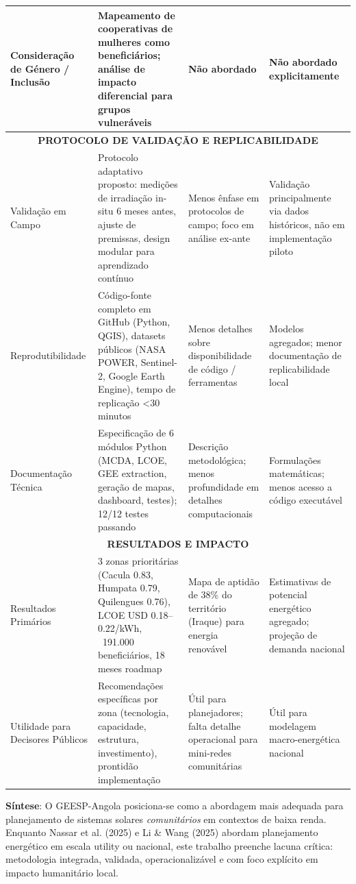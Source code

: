 \documentclass[12pt, a4paper]{article}
\begin{document}
\begin{table}[H]
\begin{tabular}{|p{3cm}|p{3cm}|p{3cm}|p{3cm}|}
\hline
Consideração de Género / Inclusão & Mapeamento de cooperativas de mulheres como beneficiários; análise de impacto diferencial para grupos vulneráveis & Não abordado & Não abordado explicitamente \\
\hline
\multicolumn{4}{|c|}{\textbf{PROTOCOLO DE VALIDAÇÃO E REPLICABILIDADE}} \\
\hline
Validação em Campo & Protocolo adaptativo proposto: medições de irradiação in-situ 6 meses antes, ajuste de premissas, design modular para aprendizado contínuo & Menos ênfase em protocolos de campo; foco em análise ex-ante & Validação principalmente via dados históricos, não em implementação piloto \\
\hline
Reprodutibilidade & Código-fonte completo em GitHub (Python, QGIS), datasets públicos (NASA POWER, Sentinel-2, Google Earth Engine), tempo de replicação <30 minutos & Menos detalhes sobre disponibilidade de código / ferramentas & Modelos agregados; menor documentação de replicabilidade local \\
\hline
Documentação Técnica & Especificação de 6 módulos Python (MCDA, LCOE, GEE extraction, geração de mapas, dashboard, testes); 12/12 testes passando & Descrição metodológica; menos profundidade em detalhes computacionais & Formulações matemáticas; menos acesso a código executável \\
\hline
\multicolumn{4}{|c|}{\textbf{RESULTADOS E IMPACTO}} \\
\hline
Resultados Primários & 3 zonas prioritárias (Cacula 0.83, Humpata 0.79, Quilengues 0.76), LCOE USD 0.18–0.22/kWh, ~191.000 beneficiários, 18 meses roadmap & Mapa de aptidão de 38\% do território (Iraque) para energia renovável & Estimativas de potencial energético agregado; projeção de demanda nacional \\
\hline
Utilidade para Decisores Públicos & Recomendações específicas por zona (tecnologia, capacidade, estrutura, investimento), prontidão implementação & Útil para planejadores; falta detalhe operacional para mini-redes comunitárias & Útil para modelagem macro-energética nacional \\
\hline
\end{tabular}
\end{table}

\textbf{Síntese}: O GEESP-Angola posiciona-se como a abordagem mais adequada para planejamento de sistemas solares \textit{comunitários} em contextos de baixa renda. Enquanto Nassar et al. (2025) e Li \& Wang (2025) abordam planejamento energético em escala utility ou nacional, este trabalho preenche lacuna crítica: metodologia integrada, validada, operacionalizável e com foco explícito em impacto humanitário local.
\end{document}
